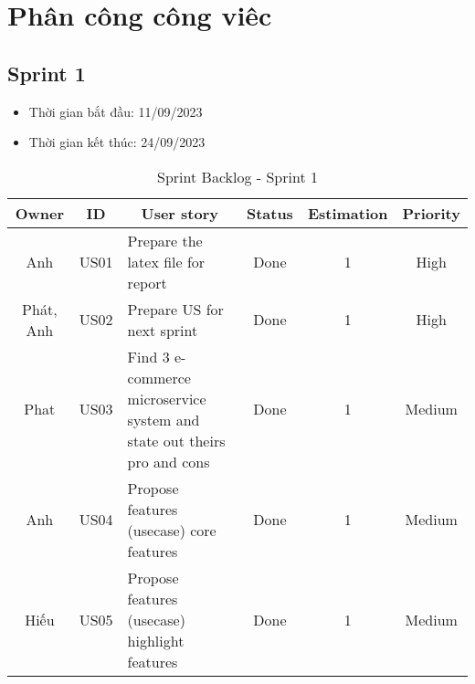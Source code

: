 \chapter{Phân công công viêc}
\section{Sprint 1}
\begin{itemize}
    \item Thời gian bắt đầu: 11/09/2023
    \item Thời gian kết thúc: 24/09/2023
\end{itemize}
\begin{table}[H]
    \begin{tabular}{|c|c|m{6cm}|c|c|c|}
    \hline
    \textbf{Owner} & \textbf{ID} & \multicolumn{1}{c|}{\textbf{User story}}                                & \textbf{Status} & \textbf{Estimation} & \textbf{Priority} \\ \hline
    Anh            & US01        & Prepare the latex file for report                                       & Done            & 1                   & High              \\ \hline
    Phát, Anh      & US02        & Prepare US for next sprint                                              & Done            & 1                   & High              \\ \hline
    Phat           & US03        & Find 3 e-commerce microservice system and state out theirs pro and cons & Done            & 1                   & Medium            \\ \hline
    Anh            & US04        & Propose features (usecase) core features                                & Done            & 1                   & Medium            \\ \hline
    Hiếu           & US05        & Propose features (usecase) highlight features                           & Done            & 1                   & Medium            \\ \hline
    \end{tabular}
    \caption{Sprint Backlog - Sprint 1}
    \label{tab:sprint-1}
\end{table}
